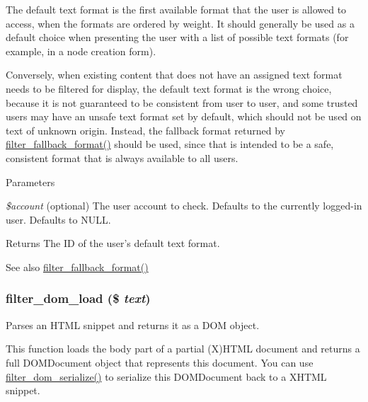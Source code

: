 The default text format is the first available format that the user is allowed to access, when the formats are ordered by weight. It should generally be used as a default choice when presenting the user with a list of possible text formats (for example, in a node creation form).

Conversely, when existing content that does not have an assigned text format needs to be filtered for display, the default text format is the wrong choice, because it is not guaranteed to be consistent from user to user, and some trusted users may have an unsafe text format set by default, which should not be used on text of unknown origin. Instead, the fallback format returned by \hyperlink{filter_8module_a8e7d56dc990c1c1e54b296ddb74bcdcd}{filter\_\-fallback\_\-format()} should be used, since that is intended to be a safe, consistent format that is always available to all users.


\begin{DoxyParams}{Parameters}
\item[{\em \$account}](optional) The user account to check. Defaults to the currently logged-\/in user. Defaults to NULL.\end{DoxyParams}
\begin{DoxyReturn}{Returns}
The ID of the user's default text format.
\end{DoxyReturn}
\begin{DoxySeeAlso}{See also}
\hyperlink{filter_8module_a8e7d56dc990c1c1e54b296ddb74bcdcd}{filter\_\-fallback\_\-format()} 
\end{DoxySeeAlso}
\hypertarget{filter_8module_aa7768070b172f41df24931d02c1217fe}{
\subsubsection[{filter\_\-dom\_\-load}]{\setlength{\rightskip}{0pt plus 5cm}filter\_\-dom\_\-load (\$ {\em text})}}
\label{filter_8module_aa7768070b172f41df24931d02c1217fe}
Parses an HTML snippet and returns it as a DOM object.

This function loads the body part of a partial (X)HTML document and returns a full DOMDocument object that represents this document. You can use \hyperlink{filter_8module_a4502a9064a1eb7680ff5371b05342ec8}{filter\_\-dom\_\-serialize()} to serialize this DOMDocument back to a XHTML snippet.


